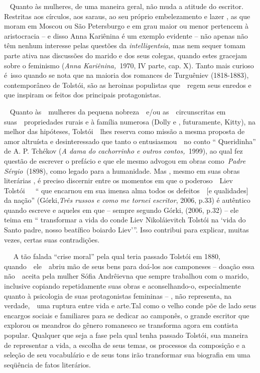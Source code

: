 ~ Quanto às mulheres, de uma maneira geral, não muda a atitude do
escritor. Restritas aos círculos, aos saraus, ao seu próprio
embelezamento e lazer , as que moram em Moscou ou São Petersburgo e em
grau maior ou menor pertencem à aristocracia -- e disso Anna Kariênina é
um exemplo evidente -- não apenas não têm nenhum interesse pelas
questões da \emph{intelligentsia}, mas nem sequer tomam parte ativa nas
discussões do marido e dos seus colegas, quando estes gracejam sobre o
feminismo (\emph{Anna Kariênina,~}1970, IV parte, cap. X). Tanto mais
curioso é~isso quando se nota que na maioria dos romances de Turguêniev
(1818-1883), contemporâneo de Tolstói, são as heroinas populistas
que~~regem seus enredos e que inspiram os feitos dos principais
protagonistas.

~ Quanto às~~mulheres da pequena nobreza~~e/ou as~~circunscritas em
suas~~propriedades rurais e à família numerosa (Dolly e , futuramente,
Kitty), na melhor das hipóteses, Tolstói~~lhes reserva como missão a
mesma proposta de amor altruísta e desinteressado que tanto o
entusiasmou~~no conto `` Queridinha'' de A. P. Tchékov (\emph{A dama do
cachorrinho e outros contos,~}1999), ao qual fez questão de escrever o
prefácio e que ele mesmo advogou em obras como~\emph{Padre
Sérgio}~(1898), como legado para a humanidade. Mas , mesmo em suas obras
literárias , é preciso discernir entre os momentos em que o
poderoso~~Liev Tolstói~~~`` que encarnou em sua imensa alma todos os
defeitos~~{[}e qualidades{]} da nação'' (Górki,\emph{Três russos e como
me tornei escritor}, 2006, p.33) é autêntico quando escreve e aqueles em
que -- sempre segundo Górki, (2006, p.32) -- ele teima em `` transformar
a vida do conde Liev Nikoláievitch Tolstói na `vida do Santo padre,
nosso beatífico boiardo Liev'''. Isso contribui para explicar, muitas
vezes, certas suas contradições.

~~ A tão falada ``crise moral'' pela qual teria passado Tolstói em 1880,
quando~~ele~~abriu mão de seus bens para doá-los aos camponeses --
doação essa não~~aceita pela mulher Sófia Andrêievna que sempre
trabalhou com o marido, inclusive copiando repetidamente suas obras e
aconselhando-o, especialmente quanto à psicologia de suas protagonistas
femininas -- , não representa, na verdade,~~uma ruptura entre vida e
arte.Tal como o velho conde põe de lado seus encargos sociais e
familiares para se dedicar ao camponês, o grande escritor que explorou
os meandros do gênero romanesco se transforma agora em contista popular.
Qualquer que seja a fase pela qual tenha passado Tolstói, sua maneira de
representar a vida, a escolha de seus temas, os processos da composição
e a seleção de seu vocabulário e de seus tons irão transformar sua
biografia em uma seqüência de fatos literários.

